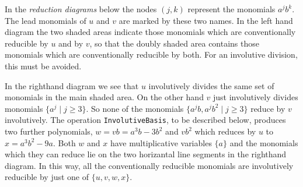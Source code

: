 \documentclass[a4paper,11pt]{report}
\begin{document}
{{\begin{Verbatim}[commandchars=!@|,fontsize=\small,frame=single,label=Example]
\end{Verbatim}
 In the \emph{reduction diagrams} below the nodes $(j,k)$ represent the monomials $a^jb^k$. The lead monomials of $u$ and $v$ are marked by these two names. In the left hand diagram the two shaded areas
indicate those monomials which are conventionally reducible by $u$ and by $v$, so that the doubly shaded area contains those monomials which are
conventionally reducible by both. For an involutive division, this must be
avoided. 

 In the right\texttt{}hand diagram we see that $u$ involutively divides the same set of monomials in the main shaded area. On the
other hand $v$ just involutively divides monomials $\{a^j \mid j \ge 3\}$. So none of the monomials $\{a^jb, a^jb^2 \mid j \ge 3\}$ reduce by $v$ involutively. The operation \texttt{InvolutiveBasis}, to be described below, produces two further polynomials, $w = vb = a^3b-3b^2$ and $vb^2$ which reduces by $u$ to $x = a^3b^2 - 9a$. Both $w$ and $x$ have multiplicative variables $\{a\}$ and the monomials which they can reduce lie on the two horizantal line
segments in the right\texttt{}hand diagram. In this way, all the
conventionally reducible monomials are involutively reducible by just one of $\{u,v,w,x\}$. 

}}
\end{document}
